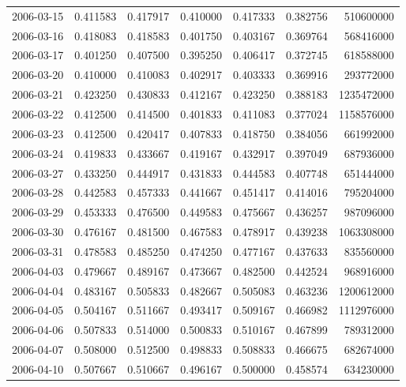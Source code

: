 \begin{tabular}{lrrrrrr}
2006-03-15 &    0.411583 &    0.417917 &    0.410000 &    0.417333 &    0.382756 &   510600000 \\
2006-03-16 &    0.418083 &    0.418583 &    0.401750 &    0.403167 &    0.369764 &   568416000 \\
2006-03-17 &    0.401250 &    0.407500 &    0.395250 &    0.406417 &    0.372745 &   618588000 \\
2006-03-20 &    0.410000 &    0.410083 &    0.402917 &    0.403333 &    0.369916 &   293772000 \\
2006-03-21 &    0.423250 &    0.430833 &    0.412167 &    0.423250 &    0.388183 &  1235472000 \\
2006-03-22 &    0.412500 &    0.414500 &    0.401833 &    0.411083 &    0.377024 &  1158576000 \\
2006-03-23 &    0.412500 &    0.420417 &    0.407833 &    0.418750 &    0.384056 &   661992000 \\
2006-03-24 &    0.419833 &    0.433667 &    0.419167 &    0.432917 &    0.397049 &   687936000 \\
2006-03-27 &    0.433250 &    0.444917 &    0.431833 &    0.444583 &    0.407748 &   651444000 \\
2006-03-28 &    0.442583 &    0.457333 &    0.441667 &    0.451417 &    0.414016 &   795204000 \\
2006-03-29 &    0.453333 &    0.476500 &    0.449583 &    0.475667 &    0.436257 &   987096000 \\
2006-03-30 &    0.476167 &    0.481500 &    0.467583 &    0.478917 &    0.439238 &  1063308000 \\
2006-03-31 &    0.478583 &    0.485250 &    0.474250 &    0.477167 &    0.437633 &   835560000 \\
2006-04-03 &    0.479667 &    0.489167 &    0.473667 &    0.482500 &    0.442524 &   968916000 \\
2006-04-04 &    0.483167 &    0.505833 &    0.482667 &    0.505083 &    0.463236 &  1200612000 \\
2006-04-05 &    0.504167 &    0.511667 &    0.493417 &    0.509167 &    0.466982 &  1112976000 \\
2006-04-06 &    0.507833 &    0.514000 &    0.500833 &    0.510167 &    0.467899 &   789312000 \\
2006-04-07 &    0.508000 &    0.512500 &    0.498833 &    0.508833 &    0.466675 &   682674000 \\
2006-04-10 &    0.507667 &    0.510667 &    0.496167 &    0.500000 &    0.458574 &   634230000 \\

\end{tabular}
